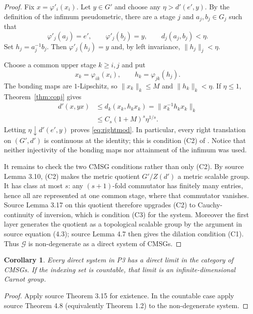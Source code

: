 \documentclass[10pt]{article}
\newtheorem{corollary}[theorem]{Corollary}
\newcommand{\norm}[1]{\lVert #1\rVert}
\begin{document}
\begin{proof}
Fix $x=\varphi'_i(x_i)$.  Let $y\in G'$ and choose any
$\eta>d'(e',y)$.  By the definition of the infimum pseudometric, there are a
stage $j$ and $a_j,b_j\in G_j$ such that
\[
 \varphi'_j(a_j)=e',\qquad \varphi'_j(b_j)=y,
 \qquad d_j(a_j,b_j)<\eta.
\]
Set $h_j=a_j^{-1}b_j$.  Then $\varphi'_j(h_j)=y$ and, by left invariance,
$\norm{h_j}_j<\eta$.

Choose a common upper stage $k\geq i,j$ and put
\[
 x_k=\varphi_{ik}(x_i),\qquad h_k=\varphi_{jk}(h_j).
\]
The bonding maps are $1$-Lipschitz, so
$\norm{x_k}_k\leq M$ and $\norm{h_k}_k<\eta$.  If $\eta\leq1$,
Theorem~\ref{thm:conj} gives
\begin{align*}
 d'(x,yx)
 &\leq d_k(x_k,h_kx_k)
   =\norm{x_k^{-1}h_kx_k}_k\\
 &\leq C_s(1+M)^s\eta^{1/s}.
\end{align*}
Letting $\eta\downarrow d'(e',y)$ proves \eqref{eq:rightmod}.  In particular,
every right translation on $(G',d')$ is continuous at the identity; this is
condition (C2) of \cite{MP}.  Notice that neither injectivity of the bonding
maps nor attainment of the infimum was used.

It remains to check the two CMSG conditions rather than only (C2).  By source
Lemma 3.10, (C2) makes the metric quotient $G'/Z(d')$ a metric scalable group.
It has class at most $s$: any $(s+1)$-fold commutator has finitely many entries,
hence all are represented at one common stage, where that commutator vanishes.
Source Lemma 3.17 on this quotient therefore upgrades (C2) to
Cauchy-continuity of inversion, which is condition (C3) for the system.
Moreover the first layer generates the quotient as a topological scalable
group by the argument in source equation (4.3); source Lemma 4.7 then gives
the dilation condition (C1).  Thus $\mathcal G$ is non-degenerate as a direct
system of CMSGs.
\end{proof}

\begin{corollary}
Every direct system in P3 has a direct limit in the category of CMSGs.  If the
indexing set is countable, that limit is an infinite-dimensional Carnot group.
\end{corollary}

\begin{proof}
Apply source Theorem 3.15 for existence.  In the countable case apply source
Theorem 4.8 (equivalently Theorem 1.2) to the non-degenerate system.
\end{proof}
\end{document}
